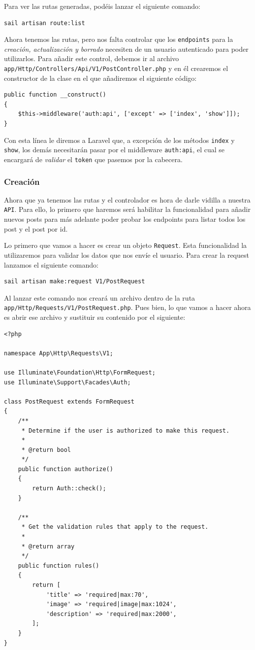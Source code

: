 \documentclass[11pt]{article}
\begin{document}
Para ver las rutas generadas, podéis lanzar el siguiente comando:
\begin{verbatim}
sail artisan route:list
\end{verbatim}

Ahora tenemos las rutas, pero nos falta controlar que los \texttt{endpoints}
para la \emph{creación, actualización y borrado} necesiten de un usuario
autenticado para poder utilizarlos. Para añadir este control, debemos
ir al archivo \texttt{app/Http/Controllers/Api/V1/PostController.php} y en él
crearemos el constructor de la clase en el que añadiremos el siguiente
código:
\begin{verbatim}
public function __construct()
{
    $this->middleware('auth:api', ['except' => ['index', 'show']]);
}
\end{verbatim}

Con esta línea le diremos a Laravel que, a excepción de los métodos
\texttt{index} y \texttt{show}, los demás necesitarán pasar por el middleware
\texttt{auth:api}, el cual se encargará de \emph{validar} el \texttt{token} que pasemos por
la cabecera.

\subsubsection{Creación}
\label{sec:org1ec6203}
Ahora que ya tenemos las rutas y el controlador es hora de darle
vidilla a nuestra \texttt{API}. Para ello, lo primero que haremos será
habilitar la funcionalidad para añadir nuevos posts para más adelante
poder probar los endpoints para listar todos los post y el post por
id.

Lo primero que vamos a hacer es crear un objeto \texttt{Request}. Esta
funcionalidad la utilizaremos para validar los datos que nos envíe el
usuario. Para crear la request lanzamos el siguiente comando:
\begin{verbatim}
sail artisan make:request V1/PostRequest
\end{verbatim}

Al lanzar este comando nos creará un archivo dentro de la ruta
\texttt{app/Http/Requests/V1/PostRequest.php}. Pues bien, lo que vamos a hacer
ahora es abrir ese archivo y sustituir su contenido por el siguiente:
\begin{verbatim}
<?php

namespace App\Http\Requests\V1;

use Illuminate\Foundation\Http\FormRequest;
use Illuminate\Support\Facades\Auth;

class PostRequest extends FormRequest
{
    /**
     * Determine if the user is authorized to make this request.
     *
     * @return bool
     */
    public function authorize()
    {
        return Auth::check();
    }

    /**
     * Get the validation rules that apply to the request.
     *
     * @return array
     */
    public function rules()
    {
        return [
            'title' => 'required|max:70',
            'image' => 'required|image|max:1024',
            'description' => 'required|max:2000',
        ];
    }
}
\end{verbatim}
\end{document}
